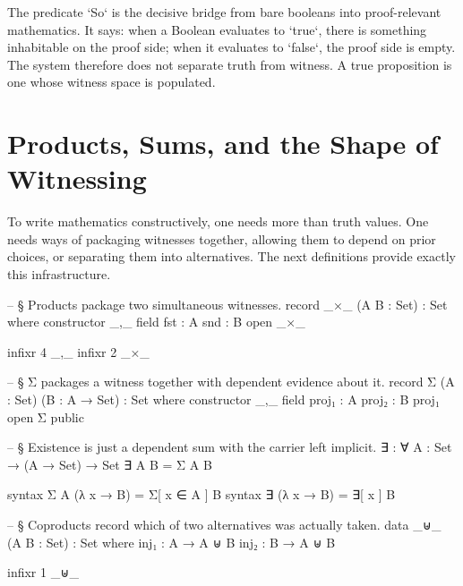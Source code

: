 \documentclass[11pt,a4paper]{book}
\begin{document}
The predicate `So` is the decisive bridge from bare booleans into proof-relevant mathematics. It says: when a Boolean evaluates to `true`, there is something inhabitable on the proof side; when it evaluates to `false`, the proof side is empty. The system therefore does not separate truth from witness. A true proposition is one whose witness space is populated.

\begin{center}
\end{center}

\section{Products, Sums, and the Shape of Witnessing}

To write mathematics constructively, one needs more than truth values. One needs ways of packaging witnesses together, allowing them to depend on prior choices, or separating them into alternatives. The next definitions provide exactly this infrastructure.

\begin{code}

-- § Products package two simultaneous witnesses.
record _×_ (A B : Set) : Set where
  constructor _,_
  field
    fst : A
    snd : B
open _×_

infixr 4 _,_
infixr 2 _×_

-- § Σ packages a witness together with dependent evidence about it.
record Σ (A : Set) (B : A → Set) : Set where
  constructor _,_
  field
    proj₁ : A
    proj₂ : B proj₁
open Σ public

-- § Existence is just a dependent sum with the carrier left implicit.
∃ : ∀ {A : Set} → (A → Set) → Set
∃ {A} B = Σ A B

syntax Σ A (λ x → B) = Σ[ x ∈ A ] B
syntax ∃ (λ x → B) = ∃[ x ] B

-- § Coproducts record which of two alternatives was actually taken.
data _⊎_ (A B : Set) : Set where
  inj₁ : A → A ⊎ B
  inj₂ : B → A ⊎ B

infixr 1 _⊎_
\end{code}
\end{document}
